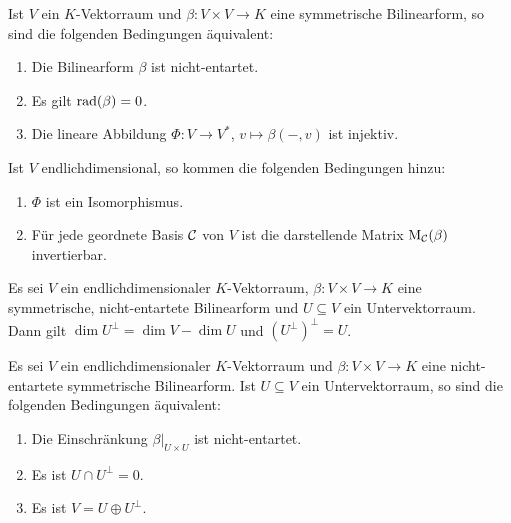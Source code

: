 \begin{proposition}
  Ist $V$ ein $K$-Vektorraum und $\beta \colon V \times V \to K$ eine symmetrische Bilinearform, so sind die folgenden Bedingungen äquivalent:
  \begin{enumerate}[leftmargin=*, label=\roman*)]
    \item
      Die Bilinearform $\beta$ ist nicht-entartet.
    \item
      Es gilt $\operatorname{rad}(\beta) = 0$.
    \item
      Die lineare Abbildung $\Phi \colon V \to V^*$, $v \mapsto \beta(-,v)$ ist injektiv.
  \end{enumerate}
  Ist $V$ endlichdimensional, so kommen die folgenden Bedingungen hinzu:
  \begin{enumerate}[leftmargin=*, label=\roman*), resume]
    \item
      $\Phi$ ist ein Isomorphismus.
    \item
      Für jede geordnete Basis $\mathcal{C}$ von $V$ ist die darstellende Matrix $\mathrm{M}_{\mathcal{C}}(\beta)$ invertierbar.
  \end{enumerate}
\end{proposition}


\begin{proposition}
  Es sei $V$ ein endlichdimensionaler $K$-Vektorraum, $\beta \colon V \times V \to K$ eine symmetrische, nicht-entartete Bilinearform und $U \subseteq V$ ein Untervektorraum.
  Dann gilt $\dim U^\perp = \dim V - \dim U$ und $(U^\perp)^\perp = U$.
\end{proposition}


\begin{proposition}
  Es sei $V$ ein endlichdimensionaler $K$-Vektorraum und $\beta \colon V \times V \to K$ eine nicht-entartete symmetrische Bilinearform.
  Ist $U \subseteq V$ ein Untervektorraum, so sind die folgenden Bedingungen äquivalent:
  \begin{enumerate}[leftmargin=*, label=\roman*)]
    \item
      Die Einschränkung $\beta|_{U \times U}$ ist nicht-entartet.
    \item
      Es ist $U \cap U^\perp = 0$.
    \item
      Es ist $V = U \oplus U^\perp$.
  \end{enumerate}
\end{proposition}











